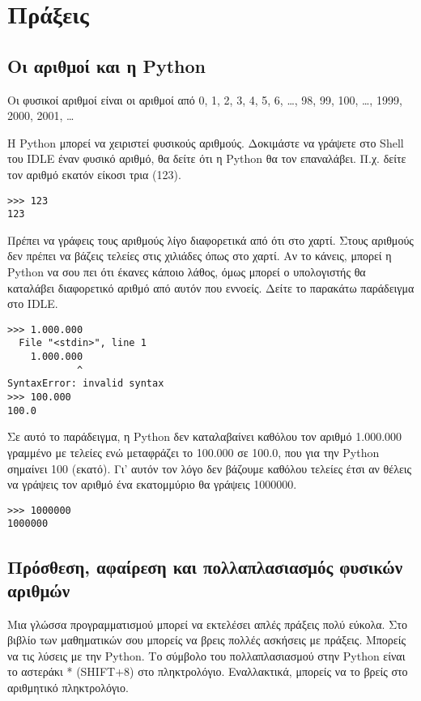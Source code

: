 \chapter{Πράξεις}

\section{Οι αριθμοί και η Python}

Οι φυσικοί αριθμοί είναι οι αριθμοί από 0, 1, 2, 3, 4, 5, 6, \ldots, 98, 99, 100, \ldots, 1999, 2000, 2001, \ldots

Η Python μπορεί να χειριστεί φυσικούς αριθμούς. Δοκιμάστε να γράψετε στο Shell του IDLE έναν φυσικό αριθμό, θα δείτε ότι η Python θα τον επαναλάβει. Π.χ. δείτε τον αριθμό εκατόν είκοσι τρια (123).
\begin{lstlisting}
>>> 123
123
\end{lstlisting}

Πρέπει να γράφεις τους αριθμούς λίγο διαφορετικά από ότι στο χαρτί. Στους αριθμούς δεν πρέπει να βάζεις τελείες στις χιλιάδες όπως στο χαρτί. Αν το κάνεις, μπορεί η Python να σου πει ότι έκανες κάποιο λάθος, όμως μπορεί ο υπολογιστής θα καταλάβει διαφορετικό αριθμό από αυτόν που εννοείς.
Δείτε το παρακάτω παράδειγμα στο IDLE.
\begin{lstlisting}
>>> 1.000.000
  File "<stdin>", line 1
    1.000.000
            ^
SyntaxError: invalid syntax
>>> 100.000
100.0
\end{lstlisting}
Σε αυτό το παράδειγμα, η Python δεν καταλαβαίνει καθόλου τον αριθμό 1.000.000 γραμμένο με τελείες ενώ μεταφράζει το 100.000 σε 100.0, που για την Python σημαίνει 100 (εκατό). Γι' αυτόν τον λόγο δεν βάζουμε καθόλου τελείες έτσι αν θέλεις να γράψεις τον αριθμό ένα εκατομμύριο θα γράψεις 1000000.
\begin{lstlisting}
>>> 1000000
1000000
\end{lstlisting}

\section{Πρόσθεση, αφαίρεση και πολλαπλασιασμός φυσικών αριθμών}
Μια γλώσσα προγραμματισμού μπορεί να εκτελέσει απλές πράξεις πολύ εύκολα. Στο βιβλίο των μαθηματικών  σου μπορείς να βρεις πολλές ασκήσεις με πράξεις. Μπορείς να τις λύσεις με την Python.
Το σύμβολο του πολλαπλασιασμού στην Python είναι το αστεράκι * (SHIFT+8) στο πληκτρολόγιο. Εναλλακτικά, μπορείς να το βρείς στο αριθμητικό πληκτρολόγιο. 

